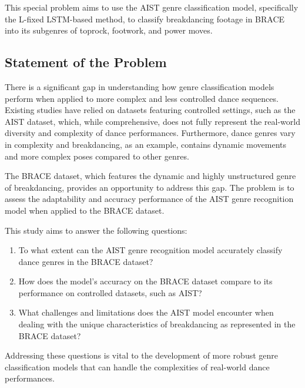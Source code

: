 \documentclass[12pt]{article}
\begin{document}
\par This special problem aims to use the AIST genre classification model, specifically the L-fixed LSTM-based method, to classify breakdancing footage in BRACE into its subgenres of toprock, footwork, and power moves.


\newpage
\subsection{Statement of the Problem}
\noindent
\par There is a significant gap in understanding how genre classification models perform when applied to more complex and less controlled dance sequences. Existing studies have relied on datasets featuring controlled settings, such as the AIST dataset, which, while comprehensive, does not fully represent the real-world diversity and complexity of dance performances. Furthermore, dance genres vary in complexity and breakdancing, as an example, contains dynamic movements and more complex poses compared to other genres. 
\vspace{5mm}

\par The BRACE dataset, which features the dynamic and highly unstructured genre of breakdancing, provides an opportunity to address this gap. The problem is to assess the adaptability and accuracy performance of the AIST genre recognition model when applied to the BRACE dataset.
\vspace{5mm}

\indent This study aims to answer the following questions:

\begin{enumerate}
    \item To what extent can the AIST genre recognition model accurately classify dance genres in the BRACE dataset?
    \item How does the model's accuracy on the BRACE dataset compare to its performance on controlled datasets, such as AIST?
    \item What challenges and limitations does the AIST model encounter when dealing with the unique characteristics of breakdancing as represented in the BRACE dataset?
\end{enumerate}


Addressing these questions is vital to the development of more robust genre classification models that can handle the complexities of real-world dance performances.
\vspace{5mm}
\end{document}
